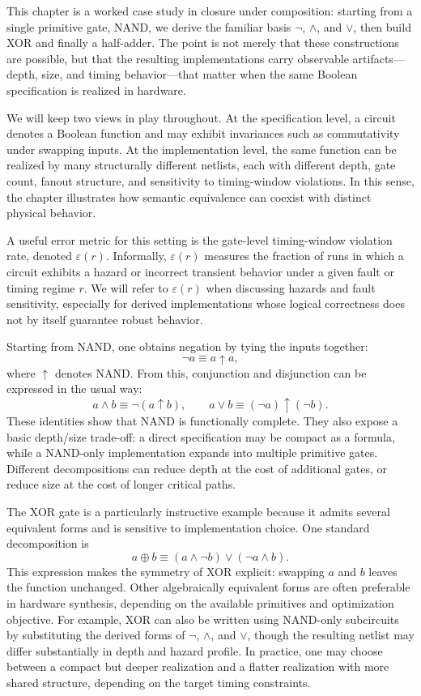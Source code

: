 This chapter is a worked case study in closure under composition: starting from a single primitive gate, NAND, we derive the familiar basis \(\neg\), \(\wedge\), and \(\vee\), then build XOR and finally a half-adder. The point is not merely that these constructions are possible, but that the resulting implementations carry observable artifacts---depth, size, and timing behavior---that matter when the same Boolean specification is realized in hardware.

We will keep two views in play throughout. At the specification level, a circuit denotes a Boolean function and may exhibit invariances such as commutativity under swapping inputs. At the implementation level, the same function can be realized by many structurally different netlists, each with different depth, gate count, fanout structure, and sensitivity to timing-window violations. In this sense, the chapter illustrates how semantic equivalence can coexist with distinct physical behavior.

A useful error metric for this setting is the gate-level timing-window violation rate, denoted \(\varepsilon(r)\). Informally, \(\varepsilon(r)\) measures the fraction of runs in which a circuit exhibits a hazard or incorrect transient behavior under a given fault or timing regime \(r\). We will refer to \(\varepsilon(r)\) when discussing hazards and fault sensitivity, especially for derived implementations whose logical correctness does not by itself guarantee robust behavior.

Starting from NAND, one obtains negation by tying the inputs together:
\[
\neg a \equiv a \mathbin{\uparrow} a,
\]
where \(\uparrow\) denotes NAND. From this, conjunction and disjunction can be expressed in the usual way:
\[
 a \wedge b \equiv \neg(a \mathbin{\uparrow} b),
\qquad
 a \vee b \equiv (\neg a) \mathbin{\uparrow} (\neg b).
\]
These identities show that NAND is functionally complete. They also expose a basic depth/size trade-off: a direct specification may be compact as a formula, while a NAND-only implementation expands into multiple primitive gates. Different decompositions can reduce depth at the cost of additional gates, or reduce size at the cost of longer critical paths.

The XOR gate is a particularly instructive example because it admits several equivalent forms and is sensitive to implementation choice. One standard decomposition is
\[
 a \oplus b \equiv (a \wedge \neg b) \vee (\neg a \wedge b).
\]
This expression makes the symmetry of XOR explicit: swapping \(a\) and \(b\) leaves the function unchanged. Other algebraically equivalent forms are often preferable in hardware synthesis, depending on the available primitives and optimization objective. For example, XOR can also be written using NAND-only subcircuits by substituting the derived forms of \(\neg\), \(\wedge\), and \(\vee\), though the resulting netlist may differ substantially in depth and hazard profile. In practice, one may choose between a compact but deeper realization and a flatter realization with more shared structure, depending on the target timing constraints.


